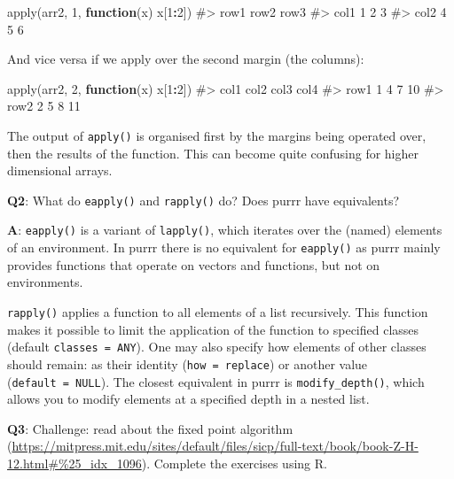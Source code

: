 \documentclass[
]{krantz}
\makeatletter
\newenvironment{Shaded}{\begin{snugshade}}{\end{snugshade}}
\newcommand{\CommentTok}[1]{\textcolor[rgb]{0.56,0.35,0.01}{\textit{#1}}}
\newcommand{\ControlFlowTok}[1]{\textcolor[rgb]{0.13,0.29,0.53}{\textbf{#1}}}
\newcommand{\DecValTok}[1]{\textcolor[rgb]{0.00,0.00,0.81}{#1}}
\newcommand{\KeywordTok}[1]{\textcolor[rgb]{0.13,0.29,0.53}{\textbf{#1}}}
\newcommand{\NormalTok}[1]{#1}
\newcommand{\OperatorTok}[1]{\textcolor[rgb]{0.81,0.36,0.00}{\textbf{#1}}}
\renewcommand{\href}[2]{#2 (\url{#1})}
\newenvironment{kframe}{%
\medskip{}
\setlength{\fboxsep}{.8em}
 \def\at@end@of@kframe{}%
 \ifinner\ifhmode%
  \def\at@end@of@kframe{\end{minipage}}%
  \begin{minipage}{\columnwidth}%
 \fi\fi%
 \def\FrameCommand##1{\hskip\@totalleftmargin \hskip-\fboxsep
 \colorbox{shadecolor}{##1}\hskip-\fboxsep
     \hskip-\linewidth \hskip-\@totalleftmargin \hskip\columnwidth}%
 \MakeFramed {\advance\hsize-\width
   \@totalleftmargin\z@ \linewidth\hsize
   \@setminipage}}%
 {\par\unskip\endMakeFramed%
 \at@end@of@kframe}
\renewenvironment{Shaded}{\begin{kframe}}{\end{kframe}}
\renewcommand{\KeywordTok} [1]{\textcolor[rgb]{0.00,0.44,0.13}{{#1}}}
\renewcommand{\DecValTok}  [1]{\textcolor[rgb]{0.25,0.63,0.44}{{#1}}}
\renewcommand{\CommentTok} [1]{\textcolor[rgb]{0.38,0.63,0.69}{{#1}}}
\renewcommand{\NormalTok}  [1]{{#1}}
\makeatother
\begin{document}
\begin{Shaded}
\begin{Highlighting}[]
\KeywordTok{apply}\NormalTok{(arr2, }\DecValTok{1}\NormalTok{, }\ControlFlowTok{function}\NormalTok{(x) x[}\DecValTok{1}\OperatorTok{:}\DecValTok{2}\NormalTok{])}
\CommentTok{#>      row1 row2 row3}
\CommentTok{#> col1    1    2    3}
\CommentTok{#> col2    4    5    6}
\end{Highlighting}
\end{Shaded}

And vice versa if we apply over the second margin (the columns):

\begin{Shaded}
\begin{Highlighting}[]
\KeywordTok{apply}\NormalTok{(arr2, }\DecValTok{2}\NormalTok{, }\ControlFlowTok{function}\NormalTok{(x) x[}\DecValTok{1}\OperatorTok{:}\DecValTok{2}\NormalTok{])}
\CommentTok{#>      col1 col2 col3 col4}
\CommentTok{#> row1    1    4    7   10}
\CommentTok{#> row2    2    5    8   11}
\end{Highlighting}
\end{Shaded}

The output of \texttt{apply()} is organised first by the margins being operated over, then the results of the function. This can become quite confusing for higher dimensional arrays.

\textbf{{Q2}}: What do \texttt{eapply()} and \texttt{rapply()} do? Does purrr have equivalents?

\textbf{{A}}: \texttt{eapply()} is a variant of \texttt{lapply()}, which iterates over the (named) elements of an environment. In purrr there is no equivalent for \texttt{eapply()} as purrr mainly provides functions that operate on vectors and functions, but not on environments.

\texttt{rapply()} applies a function to all elements of a list recursively. This function makes it possible to limit the application of the function to specified classes (default \texttt{classes\ =\ ANY}). One may also specify how elements of other classes should remain: as their identity (\texttt{how\ =\ replace}) or another value (\texttt{default\ =\ NULL}). The closest equivalent in purrr is \texttt{modify\_depth()}, which allows you to modify elements at a specified depth in a nested list.

\textbf{{Q3}}: Challenge: read about the \href{https://mitpress.mit.edu/sites/default/files/sicp/full-text/book/book-Z-H-12.html\#\%25_idx_1096}{fixed point algorithm}. Complete the exercises using R.
\end{document}
